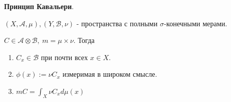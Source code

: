 \begin{theorem}
    \textbf{Принцип Кавальери}.

    $(X, \mathcal{A}, \mu), (Y, \mathcal{B}, \nu)$ - пространства с полными $\sigma$-конечными мерами.

    $C \in \mathcal{A} \otimes \mathcal{B}, \ m = \mu \times \nu$. Тогда
    \begin{enumerate}
        \item {
            $C_x \in \mathcal{B}$ при почти всех $x \in X$.
        }
        \item {
            $\phi(x) := \nu C_x$ измеримая в широком смысле.
        }
        \item {
            $m C = \int_X {\nu C_x d \mu(x)}$
        }

    \end{enumerate}
\end{theorem}
